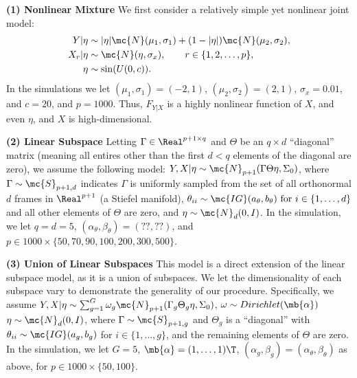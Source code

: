 \textbf{(1) Nonlinear Mixture}
%
We first consider a relatively simple yet nonlinear joint model:
\begin{subequations}
\begin{align}
	Y|\eta &\sim   |\eta| \mc{N}(\mu_1,\sigma_1) + (1-|\eta|) \mc{N}(\mu_2,\sigma_2), \\
	X_r|\eta  &\sim \mc{N}(\eta, \sigma_x), \qquad r \in \{1, 2, \ldots, p\}, \\
	\eta  &\sim \sin(U(0,c)). %
\end{align}
\end{subequations}
In the simulations we let $(\mu_1,\sigma_1)=(-2,1)$, $(\mu_2,\sigma_2)=(2,1)$, $\sigma_x=0.01$, and $c=20$, and $p=1000$. Thus, $F_{Y|X}$ is a highly nonlinear function of $X$, and even $\eta$, and $X$ is high-dimensional.  

\textbf{(2) Linear Subspace} Letting $\Gamma \in \Real^{p+1 \times q}$ and $\Theta$ be an ${q \times d}$ ``diagonal'' matrix (meaning all entires other than the first $d < q$ elements of the diagonal are zero), we assume the following model:
	$Y,X |\eta \sim \mc{N}_{p+1}(\Gamma \Theta \eta ,\Sigma_0)$,
	where 	$\Gamma \sim \mc{S}_{p+1,d}$ indicates $\Gamma$ is uniformly sampled from the set of all orthonormal $d$ frames in $\Real^{p+1}$ (a Stiefel manifold), 
	$\theta_{ii} \sim \mc{IG}(a_\theta,b_\theta) \text{ for } i \in \{1, \ldots, d\}$ and all other elements of $\Theta$ are zero, and $\eta  \sim \mc{N}_d(0, I)$.  In the simulation, we let $q=d=5$,   $(\alpha_\theta,\beta_\theta)=(??,??)$, and $p \in 1000 \times \{50, 70, 90, 100, 200, 300, 500\}$.


\textbf{(3) Union of Linear Subspaces}
This model is a direct extension of the linear subspace model, as it is a union of subspaces. We let the dimensionality of each subspace vary to demonstrate the generality of our procedure.  Specifically, we assume 	$Y,X |\eta \sim \sum_{g=1}^G \omega_g \mc{N}_{p+1}(\Gamma_g \Theta_g \eta ,\Sigma_0)$, $\omega \sim Dirichlet(\mb{\alpha})$ 
	$\eta \sim \mc{N}_d(0, I)$, 
where $\Gamma \sim \mc{S}_{p+1,g}$ and $\Theta_g$ is a ``diagonal'' with $\theta_{ii} \sim \mc{IG}(a_g,b_g)$ for  $i \in \{1, \ldots, g\}$, and the remaining elements of $\Theta$ are zero.
In the simulation, we let $G=5$,  $\mb{\alpha}=(1, \ldots, 1)\T$,  $(\alpha_g,\beta_g)=(\alpha_\theta,\beta_\theta)$ as above, for  $p \in 1000 \times \{50, 100\}$.
  
